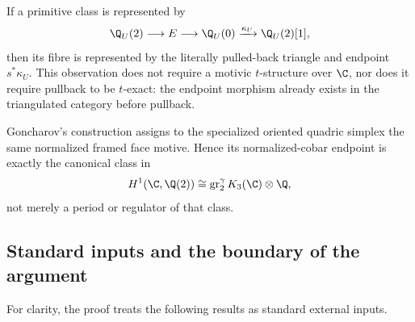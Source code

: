 If a primitive class is represented by
\[
 \Q_U(2)\longrightarrow E\longrightarrow\Q_U(0)
 \xrightarrow{\kappa_U}\Q_U(2)[1],
\]
then its fibre is represented by the literally pulled-back triangle and
endpoint \(s^*\kappa_U\).  This observation does not require a motivic
\(t\)-structure over \(\C\), nor does it require pullback to be \(t\)-exact:
the endpoint morphism already exists in the triangulated category before
pullback.

Goncharov's construction assigns to the specialized oriented quadric simplex
the same normalized framed face motive.  Hence its normalized-cobar endpoint
is exactly the canonical class in
\[
 H^1(\C,\Q(2))
 \cong \operatorname{gr}^{\gamma}_2K_3(\C)\otimes\Q,
\]
not merely a period or regulator of that class.

\subsection{Standard inputs and the boundary of the argument}
\label{cp:subsec-standard-inputs}

For clarity, the proof treats the following results as standard external
inputs.

